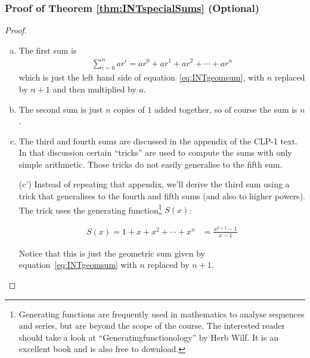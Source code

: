 \subsubsection*{Proof of Theorem \ref{thm:INTspecialSums} (Optional)}
\begin{proof}
\begin{enumerate}[(a)]
\item The first sum is
\begin{align*}
\sum_{i=0}^n ar^i
=ar^0 + ar^1 + ar^2 + \cdots + ar^n
\end{align*}
which is just the left hand side of equation~\eqref{eq:INTgeomsum}, with $n$
replaced by $n+1$ and then multiplied by $a$.
\item The second sum is just $n$ copies of $1$ added together, so of course
the sum is $n$.
\item The third and fourth sums are discussed in the appendix of the CLP-1 text. In that discussion certain ``tricks'' are used to compute the
sums with only simple arithmetic. Those tricks do not easily generalise to the fifth sum.
\item[(c')] Instead of repeating that appendix, we'll derive the third sum
using a trick that
generalises to the fourth and fifth sums (and also to higher powers). The trick uses the
generating function\footnote{Generating functions are frequently used in mathematics to
analyse sequences and series, but are beyond the scope of the course. The interested
reader should take a look at ``Generatingfunctionology'' by Herb
Wilf. It is an excellent book and is also free to download.} $S(x)$:
\begin{impeqn}\label{eq:INTpowergenfnl}
\begin{align*}
S(x) = 1+x+x^2+\cdots+x^n &= \frac{x^{n+1}-1}{x-1}
\end{align*}
\end{impeqn}
Notice that this is just the geometric sum given by equation~\ref{eq:INTgeomsum} with $n$
replaced by $n+1$.


\end{enumerate}
\end{proof}

